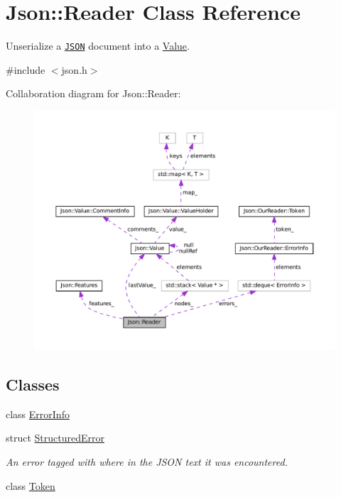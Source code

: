 \hypertarget{classJson_1_1Reader}{}\section{Json\+:\+:Reader Class Reference}
\label{classJson_1_1Reader}


Unserialize a \href{http://www.json.org}{\tt J\+S\+ON} document into a \hyperlink{classJson_1_1Value}{Value}.  




{\ttfamily \#include $<$json.\+h$>$}



Collaboration diagram for Json\+:\+:Reader\+:
\nopagebreak
\begin{figure}[H]
\begin{center}
\leavevmode
\includegraphics[width=350pt]{classJson_1_1Reader__coll__graph}
\end{center}
\end{figure}
\subsection*{Classes}
\begin{DoxyCompactItemize}
\item 
class \hyperlink{classJson_1_1Reader_1_1ErrorInfo}{Error\+Info}
\item 
struct \hyperlink{structJson_1_1Reader_1_1StructuredError}{Structured\+Error}
\begin{DoxyCompactList}\small\item\em An error tagged with where in the J\+S\+ON text it was encountered. \end{DoxyCompactList}\item 
class \hyperlink{classJson_1_1Reader_1_1Token}{Token}
\end{DoxyCompactItemize}
